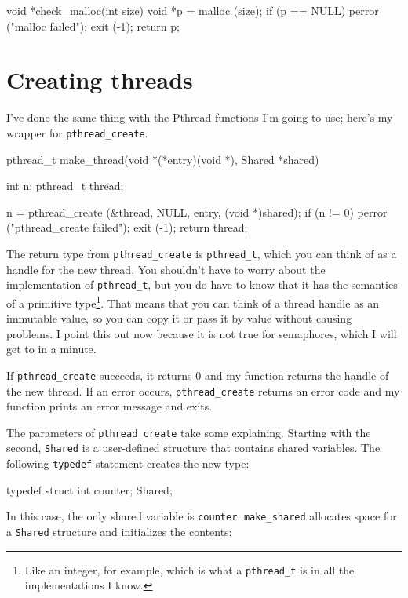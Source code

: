 \begin{lstbox}{}
void *check_malloc(int size)
{
  void *p = malloc (size);
  if (p == NULL) {
    perror ("malloc failed");
    exit (-1);
  }
  return p;
}
\end{lstbox}


\section{Creating threads}

I've done the same thing with the Pthread functions I'm going to use;
here's my wrapper for {\tt pthread\_create}.

\begin{lstbox}{}
pthread_t make_thread(void *(*entry)(void *), Shared *shared)
{
  int n;
  pthread_t thread;

  n = pthread_create (&thread, NULL, entry, (void *)shared);
  if (n != 0) {
    perror ("pthread_create failed");
    exit (-1);
  }
  return thread;
}
\end{lstbox}

The return type from {\tt pthread\_create} is {\tt pthread\_t},
which you can think of as a handle for the new thread.  You
shouldn't have to worry about the implementation of {\tt pthread\_t},
but you do have to know that it has the semantics of a primitive
type\footnote{Like an integer, for example, which is what a
{\tt pthread\_t} is in all the implementations I know.}.  That
means that you can think of a thread handle as an immutable
value, so you can copy it or pass it by value without causing
problems.  I point this out now because it is not true for
semaphores, which I will get to in a minute.

If {\tt pthread\_create} succeeds, it returns 0 and my function
returns the handle of the new thread.
If an error occurs, {\tt pthread\_create} 
returns an error code and my function prints an error message
and exits.

The parameters of {\tt pthread\_create} take some
explaining.  Starting with the second,
{\tt Shared}
is a user-defined structure that contains shared variables.
The following {\tt typedef} statement creates the new type:

\begin{lstbox}{}
typedef struct {
  int counter;
} Shared;
\end{lstbox}

In this case, the only shared variable is {\tt counter}.
{\tt make\_shared} allocates
space for a {\tt Shared} structure and initializes the contents:

